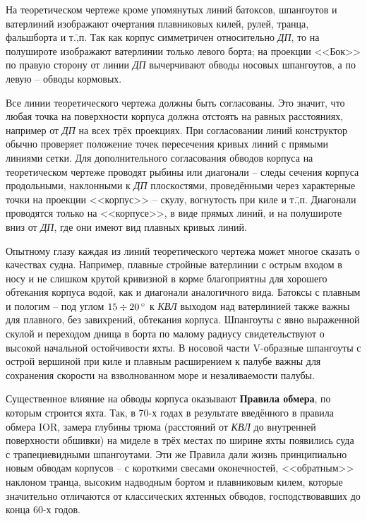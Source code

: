 На теоретическом чертеже кроме упомянутых линий батоксов, шпангоутов и
ватерлиний изображают очертания плавниковых килей, рулей, транца,
фальшборта и т.\=,п. Так как корпус симметричен относительно
\textit{ДП}, то на полушироте изображают ватерлинии только левого
борта; на проекции <<Бок>> по правую сторону от линии \textit{ДП}
вычерчивают обводы носовых шпангоутов, а по левую \--- обводы
кормовых.

Все линии теоретического чертежа должны быть согласованы. Это значит,
что любая точка на поверхности корпуса должна отстоять на равных
расстояниях, например от \textit{ДП} на всех трёх проекциях. При
согласовании линий конструктор обычно проверяет положение точек
пересечения кривых линий с прямыми линиями сетки. Для дополнительного
согласования обводов корпуса на теоретическом чертеже проводят рыбины
или диагонали \--- следы сечения корпуса продольными, наклонными к
\textit{ДП} плоскостями, проведёнными через характерные точки на
проекции <<корпус>> \--- скулу, вогнутость при киле и
т.\=,п. Диагонали проводятся только на <<корпусе>>, в виде прямых
линий, и на полушироте вниз от \textit{ДП}, где они имеют вид плавных
кривых линий.

Опытному глазу каждая из линий теоретического чертежа может многое
сказать о качествах судна. Например, плавные стройные ватерлинии с
острым входом в носу и не слишком крутой кривизной в корме
благоприятны для хорошего обтекания корпуса водой, как и диагонали
аналогичного вида. Батоксы с плавным и пологим \--- под углом
$15 \div 20\,^\circ$ к \textit{КВЛ} выходом над ватерлинией также важны
для плавного, без завихрений, обтекания корпуса. Шпангоуты с явно
выраженной скулой и переходом днища в борта по малому радиусу
свидетельствуют о высокой начальной остойчивости яхты. В носовой части
V-образные шпангоуты с острой вершиной при киле и плавным расширением
к палубе важны для сохранения скорости на взволнованном море и
незаливаемости палубы.

Существенное влияние на обводы корпуса оказывают \textbf{Правила обмера},
по которым строится яхта. Так, в 70-х годах в результате
введённого в правила обмера IOR, замера глубины трюма (расстояний от
\textit{КВЛ} до внутренней поверхности обшивки) на миделе в трёх
местах по ширине яхты появились суда с трапециевидными
шпангоутами. Эти же Правила дали жизнь принципиально новым обводам
корпусов \--- с короткими свесами оконечностей, <<обратным>> наклоном
транца, высоким надводным бортом и плавниковым килем, которые
значительно отличаются от классических яхтенных обводов,
господствовавших до конца 60-х годов.

